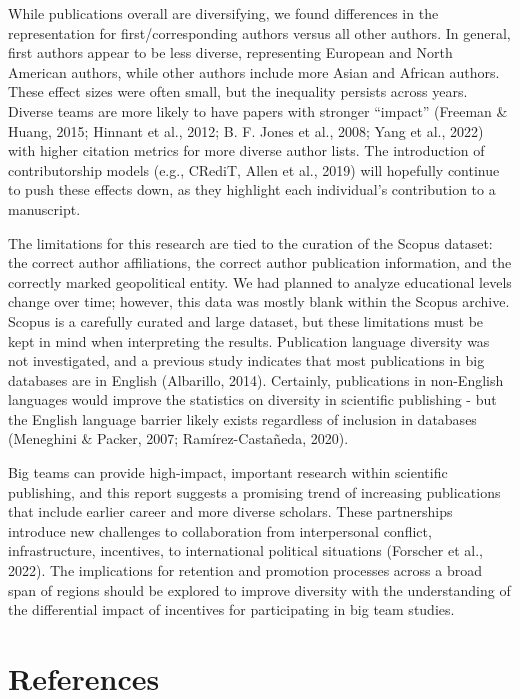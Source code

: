 \documentclass[
  man,mask,floatsintext]{apa7}
\begin{document}
While publications overall are diversifying, we found differences in the representation for first/corresponding authors versus all other authors. In general, first authors appear to be less diverse, representing European and North American authors, while other authors include more Asian and African authors. These effect sizes were often small, but the inequality persists across years. Diverse teams are more likely to have papers with stronger ``impact'' (Freeman \& Huang, 2015; Hinnant et al., 2012; B. F. Jones et al., 2008; Yang et al., 2022) with higher citation metrics for more diverse author lists.
The introduction of contributorship models (e.g., CRediT, Allen et al., 2019)
will hopefully continue to push these effects down, as they highlight
each individual's contribution to a manuscript.

The limitations for this research are tied to the curation of the Scopus dataset: the correct author affiliations, the correct author publication information, and the correctly marked geopolitical entity. We had planned to analyze educational levels change over time; however, this data was mostly blank within the Scopus archive. Scopus is a carefully curated and large dataset, but these limitations must be kept in mind when interpreting the results. Publication language diversity was not investigated, and a previous study indicates that most publications in big databases are in English (Albarillo, 2014). Certainly, publications in non-English
languages would improve the statistics on diversity in scientific
publishing - but the English language barrier likely exists regardless
of inclusion in databases (Meneghini \& Packer, 2007; Ramírez-Castañeda, 2020).

Big teams can provide high-impact, important research within scientific publishing, and this report suggests a promising trend of increasing publications that include earlier career and more diverse scholars. These partnerships introduce new challenges to collaboration from interpersonal conflict, infrastructure, incentives, to international political situations (Forscher et al., 2022). The implications for retention and promotion processes across a broad span of regions should be explored to improve diversity with the understanding of the differential impact of incentives for participating in big team studies.

\newpage

\hypertarget{references}{%
\section{References}\label{references}}
\end{document}
